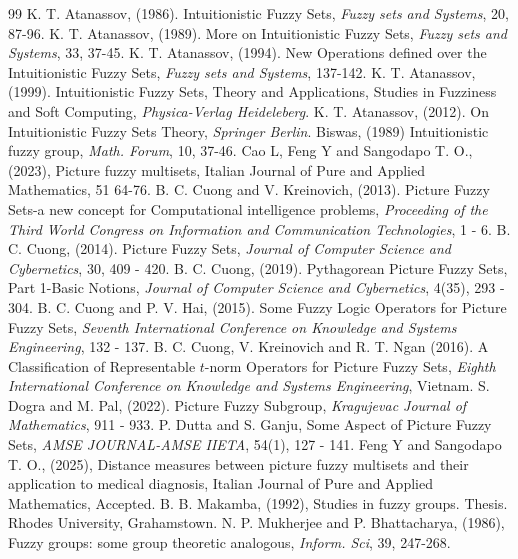 \documentclass[12pt,letterpaper]{amsart}
\theoremstyle{plain}
\theoremstyle{definition}
\numberwithin{equation}{section}
\begin{document}
\begin{thebibliography}{99}
 K. T. Atanassov, (1986). Intuitionistic Fuzzy Sets, \emph {Fuzzy sets and Systems}, 20, 87-96.
 K. T. Atanassov, (1989). More on Intuitionistic Fuzzy Sets, \emph {Fuzzy sets and Systems}, 33, 37-45.
 K. T. Atanassov, (1994). New Operations defined over the Intuitionistic Fuzzy Sets, \emph {Fuzzy sets and Systems}, 137-142.
 K. T. Atanassov, (1999). Intuitionistic Fuzzy Sets, Theory and Applications, Studies in Fuzziness and Soft Computing, \emph {Physica-Verlag Heideleberg}.
 K. T. Atanassov, (2012). On Intuitionistic Fuzzy Sets Theory, \emph {Springer Berlin}.
 Biswas, (1989) Intuitionistic fuzzy group, \emph{Math. Forum}, 10, 37-46.
 Cao L, Feng Y and Sangodapo T. O., (2023), Picture fuzzy multisets, Italian Journal of Pure and Applied Mathematics, 51  64-76.
 B. C. Cuong and V. Kreinovich, (2013). Picture Fuzzy Sets-a new concept for Computational intelligence problems, \emph{Proceeding of the Third World Congress on Information and Communication Technologies}, 1 - 6.
 B. C. Cuong, (2014). Picture Fuzzy Sets, \emph{Journal of Computer Science and Cybernetics}, 30, 409 - 420.
 B. C. Cuong, (2019). Pythagorean Picture Fuzzy Sets, Part 1-Basic Notions, \emph{Journal of Computer Science and Cybernetics}, 4(35), 293 - 304.
 B. C. Cuong and P. V. Hai, (2015). Some Fuzzy Logic Operators for Picture Fuzzy Sets, \emph{Seventh International Conference on Knowledge and Systems Engineering}, 132 - 137.
 B. C. Cuong, V. Kreinovich and R. T. Ngan (2016). A Classification of Representable $t$-norm Operators for Picture Fuzzy Sets, \emph{Eighth International Conference on Knowledge and Systems Engineering}, Vietnam.
 S. Dogra and M. Pal, (2022). Picture Fuzzy Subgroup, \emph{Kragujevac Journal of Mathematics}, 911 - 933.
 P. Dutta and S. Ganju, Some Aspect of Picture Fuzzy Sets, \emph{AMSE JOURNAL-AMSE IIETA}, 54(1), 127 - 141.
 Feng Y and Sangodapo T. O., (2025), Distance measures between picture fuzzy multisets and their application to medical diagnosis, Italian
Journal of Pure and Applied Mathematics, Accepted.
 B. B. Makamba, (1992), Studies in fuzzy groups. Thesis. Rhodes University, Grahamstown.
 N. P. Mukherjee and P. Bhattacharya, (1986), Fuzzy groups: some group theoretic analogous, \emph{Inform. Sci}, 39, 247-268.

\end{thebibliography}
\end{document}
